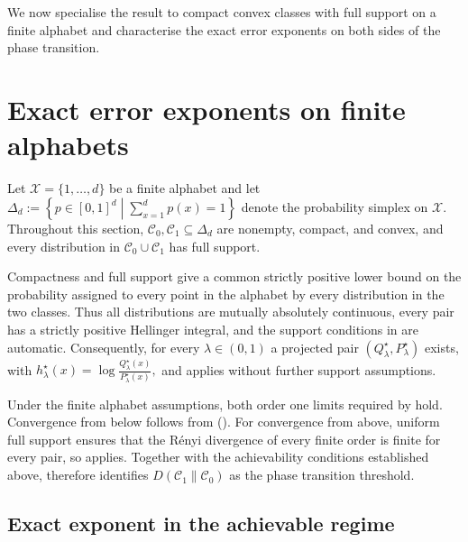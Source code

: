 \documentclass[journal,10pt,draftclsnofoot,onecolumn]{IEEEtran}
\begin{document}
We now specialise the result to compact convex classes with full support on a finite alphabet and characterise the exact error exponents on both sides of the phase transition.

\section{Exact error exponents on finite alphabets}
\label{sec:finite-alphabet-consequences}

Let $\mathcal X=\{1,\ldots,d\}$ be a finite alphabet and let
$\Delta_d:=\left\{p\in[0,1]^d \mathrel{}\middle|\mathrel{} \sum_{x=1}^d p(x)=1\right\}$
denote the probability simplex on $\mathcal X$. Throughout this section,
$\mathcal C_0,\mathcal C_1\subseteq\Delta_d$ are nonempty, compact, and convex, and every distribution in $\mathcal C_0\cup\mathcal C_1$ has full support.

Compactness and full support give a common strictly positive lower bound on the probability assigned to every point in the alphabet by every distribution in the two classes. Thus all distributions are mutually absolutely continuous, every pair has a strictly positive Hellinger integral, and the support conditions in  are automatic. Consequently, for every $\lambda\in(0,1)$ a projected pair
$(Q_\lambda^\star,P_\lambda^\star)$ exists, with $h_\lambda^\star(x)=\log\frac{Q_\lambda^\star(x)}{P_\lambda^\star(x)},$
and  applies
without further support assumptions.

Under the finite alphabet assumptions, both order one limits required by  hold. Convergence from below follows from  (). For convergence from above, uniform full support ensures that the R\'enyi divergence of every finite order is finite for every pair, so  applies. Together with the achievability conditions established above,  therefore identifies $D(\mathcal C_1\|\mathcal C_0)$ as the phase transition threshold.

\subsection{Exact exponent in the achievable regime}
\label{sec:exact-exponent}
\end{document}
